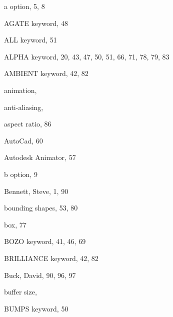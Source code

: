 \begin{theindex}

  \item {\ptt a} option, 5, 8
  \item {\ptt AGATE} keyword, 48
  \item {\ptt ALL} keyword, 51
  \item {\ptt ALPHA} keyword, 20, 43, 47, 50, 51, 66, 71, 78, 79, 83
  \item {\ptt AMBIENT} keyword, 42, 82
  \item animation, 
  \item anti-aliasing, 
  \item aspect ratio, 86
  \item {\pem {}AutoCad}, 60
  \item {\pem {}Autodesk Animator}, 57

  \indexspace

  \item {\ptt b} option, 9
  \item Bennett, Steve, 1, 90
  \item bounding shapes, 53, 80
  \item box, 77
  \item {\ptt BOZO} keyword, 41, 46, 69
  \item {\ptt BRILLIANCE} keyword, 42, 82
  \item Buck, David, 90, 96, 97
  \item buffer size, 
  \item {\ptt BUMPS} keyword, 50

  \indexspace


\end{theindex}
